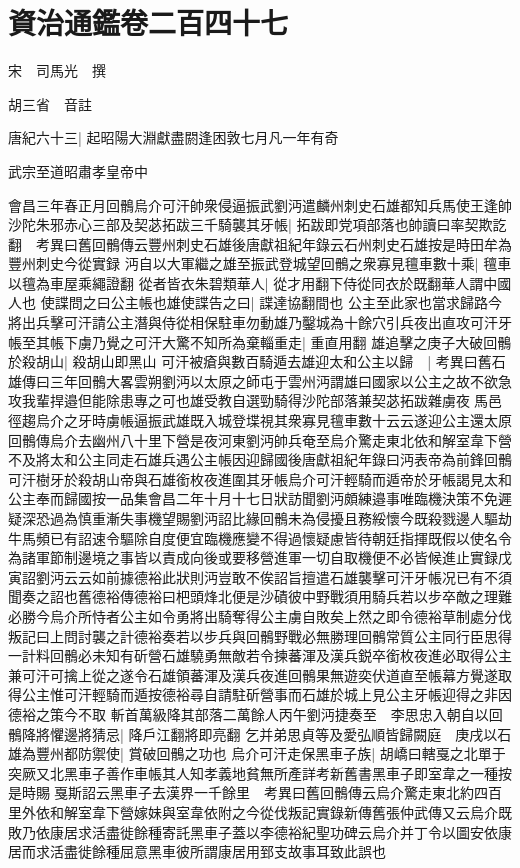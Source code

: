 \chapter{資治通鑑卷二百四十七}
宋　司馬光　撰

胡三省　音註

唐紀六十三|{
	起昭陽大淵獻盡閼逢困敦七月凡一年有奇}


武宗至道昭肅孝皇帝中

會昌三年春正月回鶻烏介可汗帥衆侵逼振武劉沔遣麟州刺史石雄都知兵馬使王逢帥沙陀朱邪赤心三部及契苾拓跋三千騎襲其牙帳|{
	拓跋即党項部落也帥讀曰率契欺訖翻　考異曰舊回鶻傳云豐州刺史石雄後唐獻祖紀年錄云石州刺史石雄按是時田牟為豐州刺史今從實録}
沔自以大軍繼之雄至振武登城望回鶻之衆寡見氊車數十乘|{
	氊車以氊為車屋乘繩證翻}
從者皆衣朱碧類華人|{
	從才用翻下侍從同衣於既翻華人謂中國人也}
使諜問之曰公主帳也雄使諜告之曰|{
	諜達協翻間也}
公主至此家也當求歸路今將出兵擊可汗請公主潛與侍從相保駐車勿動雄乃鑿城為十餘穴引兵夜出直攻可汗牙帳至其帳下虜乃覺之可汗大驚不知所為棄輜重走|{
	重直用翻}
雄追擊之庚子大破回鶻於殺胡山|{
	殺胡山即黑山}
可汗被瘡與數百騎遁去雄迎太和公主以歸　|{
	考異曰舊石雄傳曰三年回鶻大畧雲朔劉沔以太原之師屯于雲州沔謂雄曰國家以公主之故不欲急攻我輩捍邉但能除患專之可也雄受教自選勁騎得沙陀部落兼契苾拓跋雜虜夜馬邑徑趨烏介之牙時虜帳逼振武雄既入城登堞視其衆寡見氊車數十云云遂迎公主還太原回鶻傳烏介去幽州八十里下營是夜河東劉沔帥兵奄至烏介驚走東北依和解室韋下營不及將太和公主同走石雄兵遇公主帳因迎歸國後唐獻祖紀年錄曰沔表帝為前鋒回鶻可汗樹牙於殺胡山帝與石雄銜枚夜進圍其牙帳烏介可汗輕騎而遁帝於牙帳謁見太和公主奉而歸國按一品集會昌二年十月十七日狀訪聞劉沔頗練邉事唯臨機決策不免遲疑深恐過為慎重漸失事機望賜劉沔詔比緣回鶻未為侵擾且務綏懷今既殺戮邊人驅劫牛馬頻已有詔速令驅除自度便宜臨機應變不得過懷疑慮皆待朝廷指揮既假以使名令為諸軍節制邊境之事皆以責成向後或要移營進軍一切自取機便不必皆候進止實録戊寅詔劉沔云云如前據德裕此狀則沔豈敢不俟詔旨擅遣石雄襲擊可汗牙帳况已有不須聞奏之詔也舊德裕傳德裕曰杷頭烽北便是沙磧彼中野戰須用騎兵若以步卒敵之理難必勝今烏介所恃者公主如令勇將出騎奪得公主虜自敗矣上然之即令德裕草制處分伐叛記曰上問討襲之計德裕奏若以步兵與回鶻野戰必無勝理回鶻常質公主同行臣思得一計料回鶻必未知有斫營石雄驍勇無敵若令揀蕃渾及漢兵鋭卒銜枚夜進必取得公主兼可汗可擒上從之遂令石雄領蕃渾及漢兵夜進回鶻果無遊奕伏道直至帳幕方覺遂取得公主惟可汗輕騎而遁按德裕尋自請駐斫營事而石雄於城上見公主牙帳迎得之非因德裕之策今不取}
斬首萬級降其部落二萬餘人丙午劉沔捷奏至　李思忠入朝自以回鶻降將懼邊將猜忌|{
	降戶江翻將即亮翻}
乞并弟思貞等及愛弘順皆歸闕庭　庚戌以石雄為豐州都防禦使|{
	賞破回鶻之功也}
烏介可汗走保黑車子族|{
	胡嶠曰轄戛之北單于突厥又北黑車子善作車帳其人知孝義地貧無所產詳考新舊書黑車子即室韋之一種按是時賜戛斯詔云黑車子去漢界一千餘里　考異曰舊回鶻傳云烏介驚走東北約四百里外依和解室韋下營嫁妹與室韋依附之今從伐叛記實錄新傳舊張仲武傳又云烏介既敗乃依康居求活盡徙餘種寄託黑車子蓋以李德裕紀聖功碑云烏介并丁令以圖安依康居而求活盡徙餘種屈意黑車彼所謂康居用郅支故事耳致此誤也}
